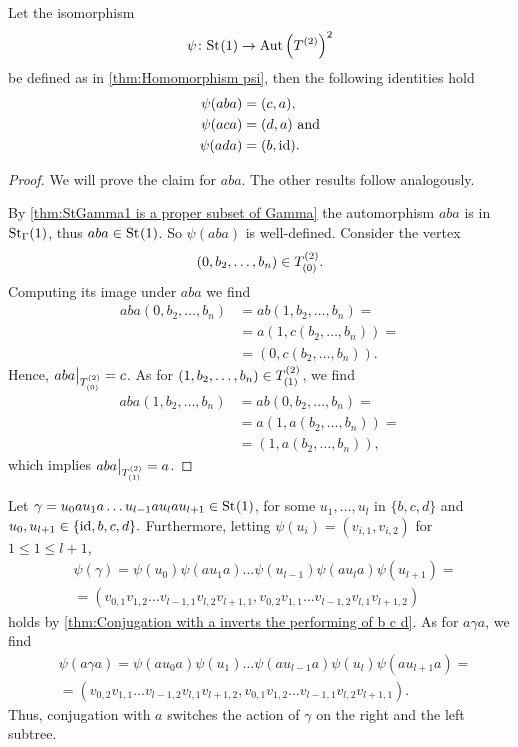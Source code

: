 \begin{thm}\label{thm:Conjugation with a inverts the performing of b c d}
Let the isomorphism
\begin{equation*}
\psi\colon\St{1}\to\AutT^2
\end{equation*}
be defined as in \cref{thm:Homomorphism psi}, then the following identities hold
\begin{align*}
\psi(aba)&=(c,a),\\
\psi(aca)&=(d,a) \text{ and}\\
\psi(ada)&=(b,\id).
\end{align*}
\end{thm}
\begin{proof}
We will prove the claim for $aba$. The other results follow analogously.

By \cref{thm:StGamma1 is a proper subset of Gamma} the automorphism $aba$ is in $\St[\Gamma]{1}$, thus $aba\in\St{1}$. So $\psi(aba)$ is well-defined. Consider the vertex
\begin{equation*}
(0,b_2,\ldots,b_n)\in\ST{(0)}.
\end{equation*}
Computing its image under $aba$ we find
\begin{align*}
aba(0,b_2,\ldots,b_n)&=ab(1,b_2,\ldots,b_n)=\\
&=a(1,c(b_2,\ldots,b_n))=\\
&=(0,c(b_2,\ldots,b_n)).
\end{align*}
Hence, $aba\big\vert_{\ST{(0)}}=c$. As for $(1,b_2,\ldots,b_n)\in\ST{(1)}$, we find
\begin{align*}
aba(1,b_2,\ldots,b_n)&=ab(0,b_2,\ldots,b_n)=\\
&=a(1,a(b_2,\ldots,b_n))=\\
&=(1,a(b_2,\ldots,b_n)),
\end{align*}
which implies $aba\big\vert_{\ST{(1)}}=a$.
\end{proof}
\begin{rem}
Let $\gamma=u_0au_1a\ldots u_{l-1}au_lau_{l+1}\in\St{1}$, for some $u_1,\ldots, u_{l}$ in $\lbrace b,c,d\rbrace$ and $u_0,u_{l+1}\in\lbrace \id,b,c,d\rbrace.$ Furthermore, letting $\psi(u_i)=(v_{i,1},v_{i,2})$ for $1\leq 1\leq l+1$, 
\begin{align*}
&\psi(\gamma)	=\psi(u_0)\psi(au_1a)\ldots\psi(u_{l-1})\psi(au_la)\psi(u_{l+1})=\\
			&=(v_{0,1}v_{1,2}\ldots v_{l-1,1}v_{l,2}v_{l+1,1},v_{0,2}v_{1,1}\ldots v_{l-1,2}v_{l,1}v_{l+1,2})
\end{align*}
holds by \cref{thm:Conjugation with a inverts the performing of b c d}. As for $a\gamma a$, we find
\begin{align*}
&\psi(a\gamma a)	=\psi(au_0a)\psi(u_1)\ldots\psi(au_{l-1}a)\psi(u_l)\psi(au_{l+1}a)=\\
			&=(v_{0,2}v_{1,1}\ldots v_{l-1,2}v_{l,1}v_{l+1,2},v_{0,1}v_{1,2}\ldots v_{l-1,1}v_{l,2}v_{l+1,1}).
\end{align*}
Thus, conjugation with $a$ switches the action of $\gamma$ on the right and the left subtree.
\end{rem}
